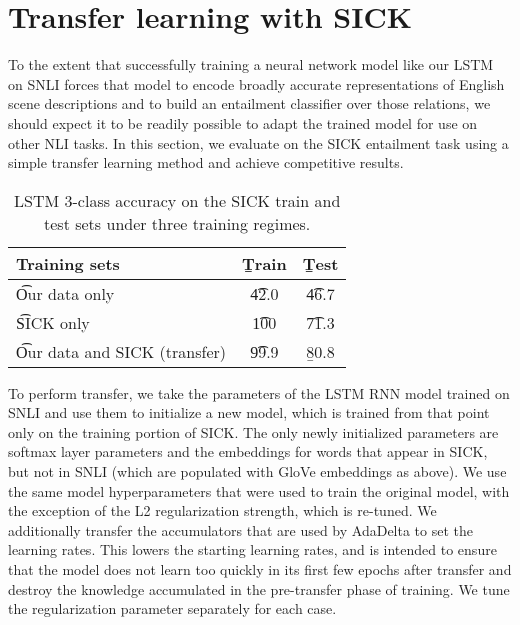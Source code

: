 \section{Transfer learning with SICK}

To the extent that successfully training a neural network model like our LSTM on SNLI forces that model to encode broadly accurate representations of English scene descriptions and to build an entailment classifier over those relations, we should expect it to be readily possible to adapt the trained model for use on other NLI tasks. In this section, we evaluate on the SICK entailment task using a simple transfer learning method \cite{pratt1991direct} and achieve competitive results.

\begin{table}
\begin{center}
\begin{tabular}{l@{\hskip \colspaceL}@{\hskip \colspaceL}c@{\hskip \colspaceL}c}
\toprule
\textbf{Training sets} & \b{Train}  & \b{Test}\\
\midrule
\t{Our data only}            & \t{42.0} & \t{46.7} \\
\t{SICK only}            & \t{100} & \t{71.3} \\
\t{Our data and SICK (transfer)}            & \t{99.9} & \b{80.8} \\
\bottomrule
\end{tabular}
\end{center}

\caption{\label{tab:transferresults}
LSTM 3-class accuracy on the SICK train and test sets under three training regimes.} 
\end{table}


To perform transfer, we take the parameters of the LSTM RNN model trained on SNLI and use them to initialize a new model, which is trained from that point only on the training portion of SICK. The only newly initialized parameters are softmax layer parameters and the embeddings for words that appear in SICK, but not in SNLI (which are populated with GloVe embeddings as above). We use the same model hyperparameters that were used to train the original model, with the exception of the L2 regularization strength, which is re-tuned. We additionally transfer the accumulators that are used by AdaDelta to set the learning rates. This lowers the starting learning rates, and is intended to ensure that the model does not learn too quickly in its first few epochs after transfer and destroy the knowledge accumulated in the pre-transfer phase of training. We tune the regularization parameter separately for each case. 

